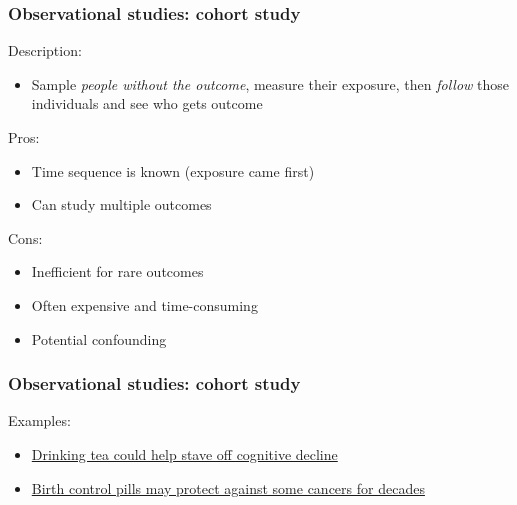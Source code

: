 \documentclass[12pt, 
hyperref={colorlinks=true, linkcolor=blue, urlcolor=cyan}]{beamer}
\begin{document}
\begin{frame}
\frametitle{Observational studies: cohort study}
Description: \vspace{-0.3cm}
\begin{itemize}
\item Sample \textit{people without the outcome}, measure their exposure, then \textit{follow} those individuals and see who gets outcome %
\end{itemize}

Pros:\vspace{-0.3cm}
\begin{itemize}
\item Time sequence is known (exposure came first)
\item Can study multiple outcomes 
\end{itemize}

Cons:\vspace{-0.3cm}
\begin{itemize}
\item Inefficient for rare outcomes %
\item Often expensive and time-consuming %
\item Potential confounding
\end{itemize}
\end{frame}

\begin{frame}
\frametitle{Observational studies: cohort study}
Examples:
\begin{itemize}
\item \href{https://www.medicalnewstoday.com/articles/316619.php}{Drinking tea could help stave off cognitive decline}
\item \href{https://www.medicalnewstoday.com/articles/316565.php}{Birth control pills may protect against some cancers for decades}
\end{itemize}
\end{frame}
\end{document}
